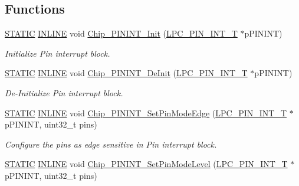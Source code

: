 \subsection*{Functions}
\begin{DoxyCompactItemize}
\item 
\hyperlink{group___l_p_c___types___public___macros_ga10b2d890d871e1489bb02b7e70d9bdfb}{S\+T\+A\+T\+IC} \hyperlink{spifi__18xx__43xx_8h_a2eb6f9e0395b47b8d5e3eeae4fe0c116}{I\+N\+L\+I\+NE} void \hyperlink{group___p_i_n_i_n_t__18_x_x__43_x_x_ga7d5f017f430fbecd18810fa08e7baef0}{Chip\+\_\+\+P\+I\+N\+I\+N\+T\+\_\+\+Init} (\hyperlink{struct_l_p_c___p_i_n___i_n_t___t}{L\+P\+C\+\_\+\+P\+I\+N\+\_\+\+I\+N\+T\+\_\+T} $\ast$p\+P\+I\+N\+I\+NT)
\begin{DoxyCompactList}\small\item\em Initialize Pin interrupt block. \end{DoxyCompactList}\item 
\hyperlink{group___l_p_c___types___public___macros_ga10b2d890d871e1489bb02b7e70d9bdfb}{S\+T\+A\+T\+IC} \hyperlink{spifi__18xx__43xx_8h_a2eb6f9e0395b47b8d5e3eeae4fe0c116}{I\+N\+L\+I\+NE} void \hyperlink{group___p_i_n_i_n_t__18_x_x__43_x_x_gaffd71b90ad59df213ae6ce90a4687727}{Chip\+\_\+\+P\+I\+N\+I\+N\+T\+\_\+\+De\+Init} (\hyperlink{struct_l_p_c___p_i_n___i_n_t___t}{L\+P\+C\+\_\+\+P\+I\+N\+\_\+\+I\+N\+T\+\_\+T} $\ast$p\+P\+I\+N\+I\+NT)
\begin{DoxyCompactList}\small\item\em De-\/\+Initialize Pin interrupt block. \end{DoxyCompactList}\item 
\hyperlink{group___l_p_c___types___public___macros_ga10b2d890d871e1489bb02b7e70d9bdfb}{S\+T\+A\+T\+IC} \hyperlink{spifi__18xx__43xx_8h_a2eb6f9e0395b47b8d5e3eeae4fe0c116}{I\+N\+L\+I\+NE} void \hyperlink{group___p_i_n_i_n_t__18_x_x__43_x_x_ga07505a16cf0d80d7dde607ebab062534}{Chip\+\_\+\+P\+I\+N\+I\+N\+T\+\_\+\+Set\+Pin\+Mode\+Edge} (\hyperlink{struct_l_p_c___p_i_n___i_n_t___t}{L\+P\+C\+\_\+\+P\+I\+N\+\_\+\+I\+N\+T\+\_\+T} $\ast$p\+P\+I\+N\+I\+NT, uint32\+\_\+t pins)
\begin{DoxyCompactList}\small\item\em Configure the pins as edge sensitive in Pin interrupt block. \end{DoxyCompactList}\item 
\hyperlink{group___l_p_c___types___public___macros_ga10b2d890d871e1489bb02b7e70d9bdfb}{S\+T\+A\+T\+IC} \hyperlink{spifi__18xx__43xx_8h_a2eb6f9e0395b47b8d5e3eeae4fe0c116}{I\+N\+L\+I\+NE} void \hyperlink{group___p_i_n_i_n_t__18_x_x__43_x_x_ga4a9efb559231903508b66858a43b552d}{Chip\+\_\+\+P\+I\+N\+I\+N\+T\+\_\+\+Set\+Pin\+Mode\+Level} (\hyperlink{struct_l_p_c___p_i_n___i_n_t___t}{L\+P\+C\+\_\+\+P\+I\+N\+\_\+\+I\+N\+T\+\_\+T} $\ast$p\+P\+I\+N\+I\+NT, uint32\+\_\+t pins)

\end{DoxyCompactItemize}
